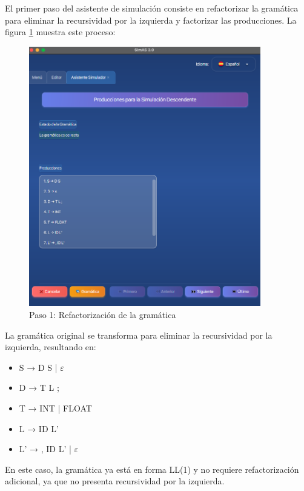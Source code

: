El primer paso del asistente de simulación consiste en refactorizar la gramática para eliminar la recursividad por la izquierda y factorizar las producciones. La figura \ref{fig:ejemplo_simulador_paso1} muestra este proceso:

\needspace{8cm}
\begin{figure}[H]
    \centering
    \includegraphics[width=0.9\textwidth]{figuras/ejemplo_practico/simulador_paso1.png}
    \caption{Paso 1: Refactorización de la gramática}
    \label{fig:ejemplo_simulador_paso1}
\end{figure}

La gramática original se transforma para eliminar la recursividad por la izquierda, resultando en:
\begin{itemize}
    \item S → D S | $\varepsilon$
    \item D → T L ;
    \item T → INT | FLOAT
    \item L → ID L'
    \item L' → , ID L' | $\varepsilon$
\end{itemize}

En este caso, la gramática ya está en forma LL(1) y no requiere refactorización adicional, ya que no presenta recursividad por la izquierda.

